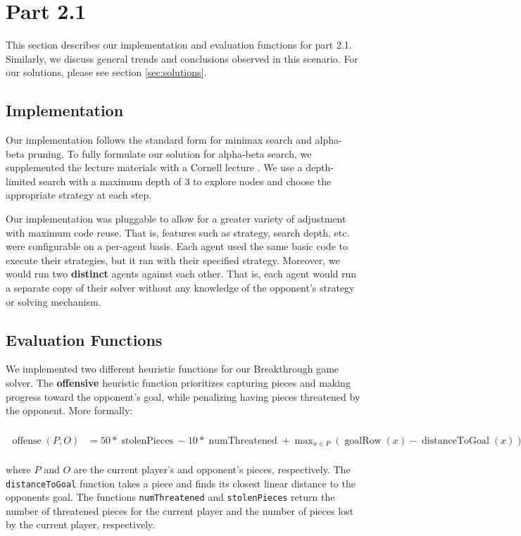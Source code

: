 \documentclass{article}
\begin{document}
\section{Part 2.1}
This section describes our implementation and evaluation functions for part 2.1. Similarly, we discuss general trends and conclusions observed in this scenario. For our solutions, please see section \ref{sec:solutions}.

\subsection{Implementation}

Our implementation follows the standard form for minimax search and alpha-beta pruning. To fully formulate our solution for alpha-beta search, we supplemented the lecture materials with a Cornell lecture \cite{cornellalphabeta}. We use a depth-limited search with a maximum depth of 3 to explore nodes and choose the appropriate strategy at each step.

Our implementation was pluggable to allow for a greater variety of adjustment with maximum code reuse. That is, features such as strategy, search depth, etc. were configurable on a per-agent basis. Each agent used the same basic code to execute their strategies, but it ran with their specified strategy. Moreover, we would run two \textbf{distinct} agents against each other. That is, each agent would run a separate copy of their solver without any knowledge of the opponent's strategy or solving mechanism.

\subsection{Evaluation Functions}
We implemented two different heuristic functions for our Breakthrough game solver. The \textbf{offensive} heuristic function prioritizes capturing pieces and making progress toward the opponent's goal, while penalizing having pieces threatened by the opponent. More formally:
\\\\
$
\begin{aligned}
\operatorname{offense}(P, O) &= 50 * \operatorname{stolenPieces} - 10 * \operatorname{numThreatened} + \max_{x \in P}{(\operatorname{goalRow}(x) - \operatorname{distanceToGoal}(x))}^2
\end{aligned}
$
\\\\
where $P$ and $O$ are the current player's and opponent's pieces, respectively. The \texttt{distanceToGoal} function takes a piece and finds its closest linear distance to the opponents goal. The functions \texttt{numThreatened} and \texttt{stolenPieces} return the number of threatened pieces for the current player and the number of pieces lost by the current player, respectively.
\end{document}
